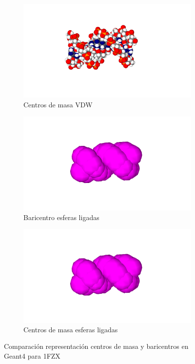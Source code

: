 \begin{figure}
\begin{subfigure}{.5\textwidth}
  \centering
  \includegraphics[width=.78\linewidth]{./Figures/1fzxvdw.png}
  \caption{Centros de masa VDW}
  \label{fig:sub444}
\end{subfigure}
\begin{subfigure}{.5\textwidth}
  \centering
  \includegraphics[width=.78\linewidth]{./Figures/1fzxba.png}
  \caption{Baricentro esferas ligadas}
  \label{fig:sub555}
\end{subfigure}%
\begin{subfigure}{.5\textwidth}
  \centering
  \includegraphics[width=.78\linewidth]{./Figures/1fzxba.png}
  \caption{Centros de masa esferas ligadas}
  \label{fig:sub666}
\end{subfigure}
\caption[Comparación de centros de masa y baricentros en Geant4 1FZX]{Comparación representación centros de masa y baricentros en Geant4 para 1FZX}
\label{hh}
\end{figure}




